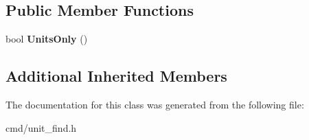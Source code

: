 \subsection*{Public Member Functions}
\begin{DoxyCompactItemize}
\item 
bool {\bfseries Units\+Only} ()\hypertarget{classNearestBoltLocator_abcde2137d82f9d03b5bb199a48d6c0b8}{}\label{classNearestBoltLocator_abcde2137d82f9d03b5bb199a48d6c0b8}

\end{DoxyCompactItemize}
\subsection*{Additional Inherited Members}


The documentation for this class was generated from the following file\+:\begin{DoxyCompactItemize}
\item 
cmd/unit\+\_\+find.\+h\end{DoxyCompactItemize}
